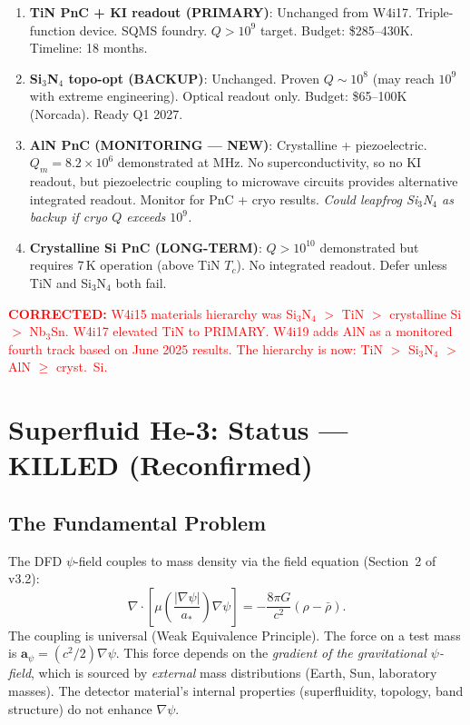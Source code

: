 \documentclass[11pt]{article}
\theoremstyle{remark}
\newcommand{\ee}[1]{\times 10^{#1}}
\newcommand{\corrected}[1]{\textcolor{red}{\textbf{CORRECTED:} #1}}
\begin{document}
\begin{tcolorbox}[colback=teal!5!white, colframe=teal!50!black,
  title=\textbf{Revised Materials Hierarchy (W4i19)}]
\begin{enumerate}
  \item \textbf{TiN PnC + KI readout (PRIMARY)}: Unchanged from W4i17.
    Triple-function device. SQMS foundry. $Q > 10^9$ target.
    Budget: \$285--430K. Timeline: 18 months.
  \item \textbf{Si$_3$N$_4$ topo-opt (BACKUP)}: Unchanged. Proven
    $Q \sim 10^8$ (may reach $10^9$ with extreme engineering). Optical
    readout only. Budget: \$65--100K (Norcada). Ready Q1 2027.
  \item \textbf{AlN PnC (MONITORING --- NEW)}: Crystalline + piezoelectric.
    $Q_m = 8.2\ee{6}$ demonstrated at MHz. No superconductivity, so no
    KI readout, but piezoelectric coupling to microwave circuits provides
    alternative integrated readout. Monitor for PnC + cryo results.
    \emph{Could leapfrog Si$_3$N$_4$ as backup if cryo $Q$ exceeds
    $10^9$.}
  \item \textbf{Crystalline Si PnC (LONG-TERM)}: $Q > 10^{10}$
    demonstrated but requires 7\,K operation (above TiN $T_c$).
    No integrated readout. Defer unless TiN and Si$_3$N$_4$ both fail.
\end{enumerate}
\end{tcolorbox}

\corrected{W4i15 materials hierarchy was Si$_3$N$_4$ $>$ TiN $>$
crystalline Si $>$ Nb$_3$Sn. W4i17 elevated TiN to PRIMARY. W4i19
adds AlN as a monitored fourth track based on June 2025 results.
The hierarchy is now: TiN $>$ Si$_3$N$_4$ $>$ AlN $\geq$ cryst.\ Si.}


\section{Superfluid He-3: Status --- KILLED (Reconfirmed)}
\label{sec:He3}

\subsection{The Fundamental Problem}

The DFD $\psi$-field couples to mass density via the field equation
(Section~2 of v3.2):
\begin{equation}
  \nabla \cdot \left[\mu\!\left(\frac{|\nabla\psi|}{a_*}\right)
  \nabla\psi\right] = -\frac{8\pi G}{c^2}(\rho - \bar{\rho}).
  \label{eq:field}
\end{equation}
The coupling is universal (Weak Equivalence Principle). The force on
a test mass is $\mathbf{a}_\psi = (c^2/2)\nabla\psi$. This force
depends on the \emph{gradient of the gravitational $\psi$-field},
which is sourced by \emph{external} mass distributions (Earth, Sun,
laboratory masses). The detector material's internal properties
(superfluidity, topology, band structure) do not enhance $\nabla\psi$.
\end{document}
